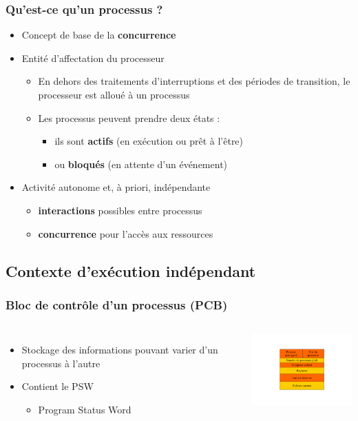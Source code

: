 \begin{frame}
\frametitle{Qu'est-ce qu'un processus ?}
\begin{itemize}
\item Concept de base de la \textbf{concurrence}
\item Entité d'affectation du processeur
\begin{itemize}
\item En dehors des traitements d'interruptions et des périodes de transition, le processeur est alloué à un processus
\item Les processus peuvent prendre deux états : 
\begin{itemize}
\item ils sont \textbf{actifs} (en exécution ou prêt à l'être)
\item ou \textbf{bloqués} (en attente d'un événement)
\end{itemize}

\end{itemize}
\item Activité autonome et, à priori, indépendante
\begin{itemize}
\item \textbf{interactions} possibles entre processus
\item \textbf{concurrence} pour l'accès aux ressources
\end{itemize}
\end{itemize}
\end{frame}

\subsection{Contexte d'exécution indépendant}

\begin{frame}
\frametitle{Bloc de contrôle d’un processus (PCB)}
\begin{columns}
\begin{itemize}
\item Stockage des informations pouvant varier d’un processus à l’autre
\item Contient le PSW
\begin{itemize}
\item Program Status Word
\end{itemize}
\end{itemize}
\includegraphics[width=5cm]{../illustration/PCB.pdf}
\end{columns}
\end{frame}


